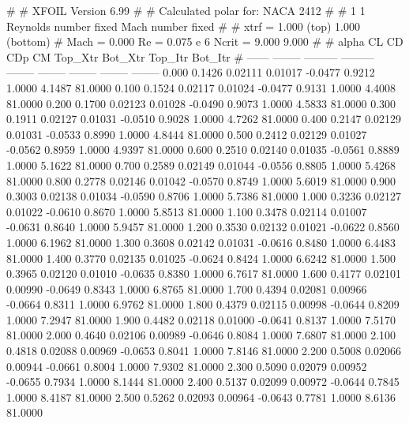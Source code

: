 #  
#       XFOIL         Version 6.99
#  
# Calculated polar for: NACA 2412                                       
#  
# 1 1 Reynolds number fixed          Mach number fixed         
#  
# xtrf =   1.000 (top)        1.000 (bottom)  
# Mach =   0.000     Re =     0.075 e 6     Ncrit =   9.000  9.000
#  
#   alpha    CL        CD       CDp       CM     Top_Xtr  Bot_Xtr  Top_Itr  Bot_Itr
#  ------ -------- --------- --------- -------- -------- -------- -------- --------
   0.000   0.1426   0.02111   0.01017  -0.0477   0.9212   1.0000   4.1487  81.0000
   0.100   0.1524   0.02117   0.01024  -0.0477   0.9131   1.0000   4.4008  81.0000
   0.200   0.1700   0.02123   0.01028  -0.0490   0.9073   1.0000   4.5833  81.0000
   0.300   0.1911   0.02127   0.01031  -0.0510   0.9028   1.0000   4.7262  81.0000
   0.400   0.2147   0.02129   0.01031  -0.0533   0.8990   1.0000   4.8444  81.0000
   0.500   0.2412   0.02129   0.01027  -0.0562   0.8959   1.0000   4.9397  81.0000
   0.600   0.2510   0.02140   0.01035  -0.0561   0.8889   1.0000   5.1622  81.0000
   0.700   0.2589   0.02149   0.01044  -0.0556   0.8805   1.0000   5.4268  81.0000
   0.800   0.2778   0.02146   0.01042  -0.0570   0.8749   1.0000   5.6019  81.0000
   0.900   0.3003   0.02138   0.01034  -0.0590   0.8706   1.0000   5.7386  81.0000
   1.000   0.3236   0.02127   0.01022  -0.0610   0.8670   1.0000   5.8513  81.0000
   1.100   0.3478   0.02114   0.01007  -0.0631   0.8640   1.0000   5.9457  81.0000
   1.200   0.3530   0.02132   0.01021  -0.0622   0.8560   1.0000   6.1962  81.0000
   1.300   0.3608   0.02142   0.01031  -0.0616   0.8480   1.0000   6.4483  81.0000
   1.400   0.3770   0.02135   0.01025  -0.0624   0.8424   1.0000   6.6242  81.0000
   1.500   0.3965   0.02120   0.01010  -0.0635   0.8380   1.0000   6.7617  81.0000
   1.600   0.4177   0.02101   0.00990  -0.0649   0.8343   1.0000   6.8765  81.0000
   1.700   0.4394   0.02081   0.00966  -0.0664   0.8311   1.0000   6.9762  81.0000
   1.800   0.4379   0.02115   0.00998  -0.0644   0.8209   1.0000   7.2947  81.0000
   1.900   0.4482   0.02118   0.01000  -0.0641   0.8137   1.0000   7.5170  81.0000
   2.000   0.4640   0.02106   0.00989  -0.0646   0.8084   1.0000   7.6807  81.0000
   2.100   0.4818   0.02088   0.00969  -0.0653   0.8041   1.0000   7.8146  81.0000
   2.200   0.5008   0.02066   0.00944  -0.0661   0.8004   1.0000   7.9302  81.0000
   2.300   0.5090   0.02079   0.00952  -0.0655   0.7934   1.0000   8.1444  81.0000
   2.400   0.5137   0.02099   0.00972  -0.0644   0.7845   1.0000   8.4187  81.0000
   2.500   0.5262   0.02093   0.00964  -0.0643   0.7781   1.0000   8.6136  81.0000
